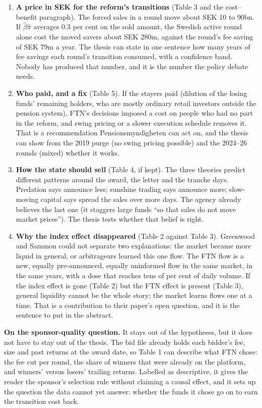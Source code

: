 \documentclass[11pt,a4paper]{article}
\begin{document}
\begin{enumerate}[nosep]
\item \textbf{A price in SEK for the reform's transitions} (Table 3 and the cost--benefit paragraph). The forced sales in a round move about SEK 10 to 90bn. If $\hat\beta\hat\pi$ averages 0.3 per cent on the sold amount, the Swedish active round alone cost the moved savers about SEK 280m, against the round's fee saving of SEK 79m a year. The thesis can state in one sentence how many years of fee savings each round's transition consumed, with a confidence band. Nobody has produced that number, and it is the number the policy debate needs.
\item \textbf{Who paid, and a fix} (Table 5). If the stayers paid (dilution of the losing funds' remaining holders, who are mostly ordinary retail investors outside the pension system), FTN's decisions imposed a cost on people who had no part in the reform, and swing pricing or a slower execution schedule removes it. That is a recommendation Pensionsmyndigheten can act on, and the thesis can show from the 2019 purge (no swing pricing possible) and the 2024--26 rounds (mixed) whether it works.
\item \textbf{How the state should sell} (Table 4, if kept). The three theories predict different patterns around the award, the letter and the tranche days. Predation says announce less; sunshine trading says announce more; slow-moving capital says spread the sales over more days. The agency already believes the last one (it staggers large funds ``so that sales do not move market prices''). The thesis tests whether that belief is right.
\item \textbf{Why the index effect disappeared} (Table 2 against Table 3). Greenwood and Sammon could not separate two explanations: the market became more liquid in general, or arbitrageurs learned this one flow. The FTN flow is a new, equally pre-announced, equally uninformed flow in the same market, in the same years, with a dose that reaches tens of per cent of daily volume. If the index effect is gone (Table 2) but the FTN effect is present (Table 3), general liquidity cannot be the whole story; the market learns flows one at a time. That is a contribution to their paper's open question, and it is the sentence to put in the abstract.
\end{enumerate}

\textbf{On the sponsor-quality question.} It stays out of the hypotheses, but it does not have to stay out of the thesis. The bid file already holds each bidder's fee, size and past returns at the award date, so Table 1 can describe what FTN chose: the fee cut per round, the share of winners that were already on the platform, and winners' versus losers' trailing returns. Labelled as descriptive, it gives the reader the sponsor's selection rule without claiming a causal effect, and it sets up the question the data cannot yet answer: whether the funds it chose go on to earn the transition cost back.
\end{document}

